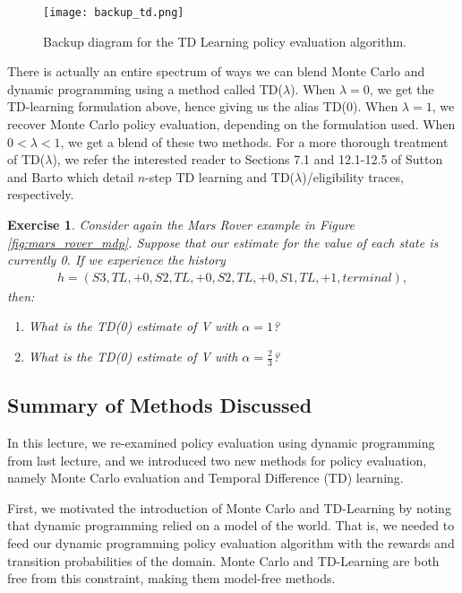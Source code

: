 \documentclass{article}
\newtheorem{exercise}{Exercise}[section]
\begin{document}
\begin{figure}
    \centering
    \texttt{[image: backup\_td.png]}
    \caption{Backup diagram for the TD Learning policy evaluation algorithm.} \label{fig:backup-td}
\end{figure}

There is actually an entire spectrum of ways we can blend Monte Carlo and dynamic programming using a method called TD($\lambda$).  When $\lambda = 0$, we get the TD-learning formulation above, hence giving us the alias TD(0).  When $\lambda = 1$, we recover Monte Carlo policy evaluation, depending on the formulation used.  When $0 < \lambda < 1$, we get a blend of these two methods.  For a more thorough treatment of TD($\lambda$), we refer the interested reader to Sections 7.1 and 12.1-12.5 of Sutton and Barto \cite{sb18} which detail $n$-step TD learning and TD($\lambda$)/eligibility traces, respectively.

\begin{exercise}
Consider again the Mars Rover example in Figure \ref{fig:mars_rover_mdp}.  Suppose that our estimate for the value of each state is currently 0.  If we experience the history
\begin{align*}
h = (S3, TL, +0, S2, TL, +0, S2, TL, +0, S1, TL, +1, terminal),
\end{align*}
then:
\begin{enumerate}[noitemsep,partopsep=0pt,topsep=0pt,parsep=0pt]
	\item What is the TD(0) estimate of V with $\alpha = 1$?
	\item What is the TD(0) estimate of V with $\alpha = \frac{2}{3}$?
\end{enumerate}
\end{exercise}

\subsection{Summary of Methods Discussed}

In this lecture, we re-examined policy evaluation using dynamic programming from last lecture, and we introduced two new methods for policy evaluation, namely Monte Carlo evaluation and Temporal Difference (TD) learning.

First, we motivated the introduction of Monte Carlo and TD-Learning by noting that dynamic programming relied on a model of the world.  That is, we needed to feed our dynamic programming policy evaluation algorithm with the rewards and transition probabilities of the domain.  Monte Carlo and TD-Learning are both free from this constraint, making them model-free methods.
\end{document}
